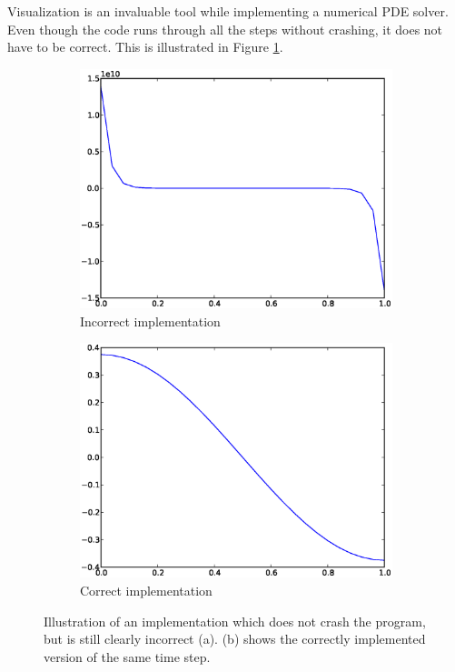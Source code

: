 \noindent Visualization is an invaluable tool while implementing a numerical PDE solver. 
Even though the code runs through all the steps without crashing, it does not have to be correct. 
This is illustrated in Figure \ref{appendix:visual_debugging}.
\begin{figure}[H]
 \centering
 \begin{subfigure}[t]{0.48\textwidth}
  \includegraphics[width=\textwidth]{Figures/incorrect_implementation.eps}
  \caption{Incorrect implementation}
 \end{subfigure}
 \begin{subfigure}[t]{0.48\textwidth}
  \includegraphics[width=\textwidth]{Figures/correct_implementation.eps}
  \caption{Correct implementation}
 \end{subfigure}
 \caption[Visual debugging]{Illustration of an implementation which does not crash the program, but is still clearly incorrect (a). (b) shows the correctly implemented version of the same time step.}
 \label{appendix:visual_debugging}
\end{figure}

